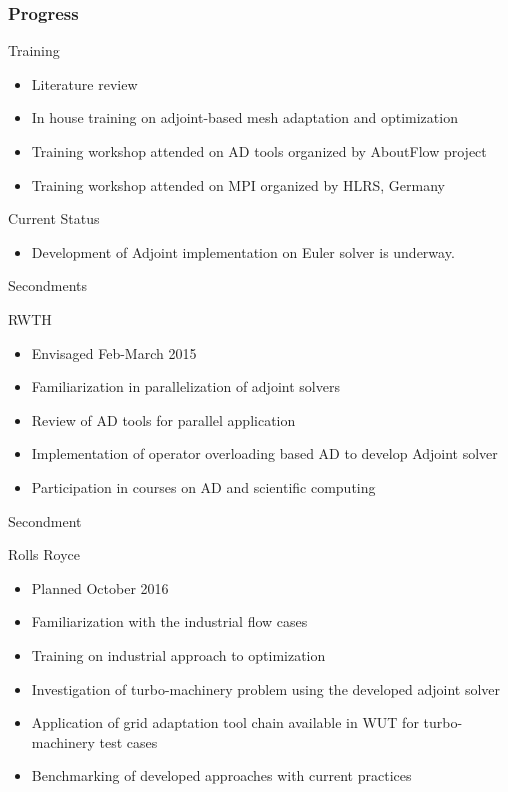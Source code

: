 \begin{frame}
\frametitle{Progress}
	\begin{block}{Training}
		\begin{itemize}
			\item Literature review
			\item In house training on adjoint-based mesh adaptation and optimization
			\item Training workshop attended on AD tools organized by AboutFlow project
			\item Training workshop attended on MPI organized by HLRS, Germany
		\end{itemize}
	\end{block}
	\begin{block}{Current Status}
		\begin{itemize}
			\item Development of Adjoint implementation on Euler solver is underway.
		\end{itemize}	
	\end{block}
\end{frame}

\begin{frame}{Secondments}

\begin{block}{RWTH}
\begin{itemize}
\item Envisaged Feb-March 2015
\item Familiarization in parallelization of adjoint solvers
\item Review of AD tools for parallel application
\item Implementation of operator overloading based AD to develop Adjoint solver 
\item Participation in courses on AD and scientific computing
\end{itemize}
\end{block}
\end{frame}
\begin{frame}{Secondment}
\begin{block}{Rolls Royce}
\begin{itemize}
\item Planned October 2016
\item Familiarization with the industrial flow cases
\item Training on industrial approach to optimization
\item Investigation of turbo-machinery problem using the developed adjoint solver 
\item Application of grid adaptation tool chain available in WUT for turbo-machinery test cases
\item Benchmarking of developed approaches with current practices
\end{itemize}
\end{block}
\end{frame}

